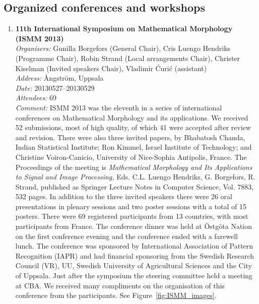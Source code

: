 

\subsection{Organized conferences and workshops}
\begin{enumerate}
\label{sec:organized_conferences}
\item 
{\bf 11th International Symposium on Mathematical Morphology (ISMM 2013)} \\
{\em Organisers:} Gunilla Borgefors (General Chair), Cris Luengo Hendriks (Programme Chair), Robin Strand (Local arrangements Chair), Christer Kiselman (Invited speakers Chair), Vladimir {\'C}uri{\'c} (assistant)\\
{\em Address:} {\AA}ngstr\"{o}m, Uppsala \\
{\em Date:} 20130527--20130529 \\
{\em Attendees:} 69 \\
{\em Comment:} ISMM 2013 was the eleventh in a series of international conferences on Mathematical Morphology and its applications. We received 52 submissions, most of high quality, of which 41 were accepted after review and revision. There were also three invited papers, by Bhabatosh Chanda, Indian Statistical Institute; Ron Kimmel, Israel Institute of Technology; and Christine Voiron-Canicio, University of Nice-Sophia Antipolis, France. The Proceedings of the meeting is {\em Mathematical Morphology and Its Applications to Signal and Image Processing,} Eds. C.L. Luengo Hendriks, G. Borgefors, R. Strand, published as Springer Lecture Notes in Computer Science, Vol. 7883, 532 pages. In addition to the three invited speakers there were 26 oral presentations in plenary sessions and two poster sessions with a total of 15 posters. There were 69 registered participants from 13 countries, with most participants from France. The conference dinner was held at \"{O}stg\"{o}ta Nation on the first conference evening and the conference ended with a farewell lunch. The conference was sponsored by International Association of Pattern Recognition (IAPR) and had financial sponsoring from the Swedish Research Council (VR), UU, Swedish University of Agricultural Sciences and the City of Uppsala. Just after the symposium the steering committee held a meeting at CBA. We received many compliments on the organisation of this conference from the participants. See Figure~\ref{fig:ISMM_images}.


\end{enumerate}
